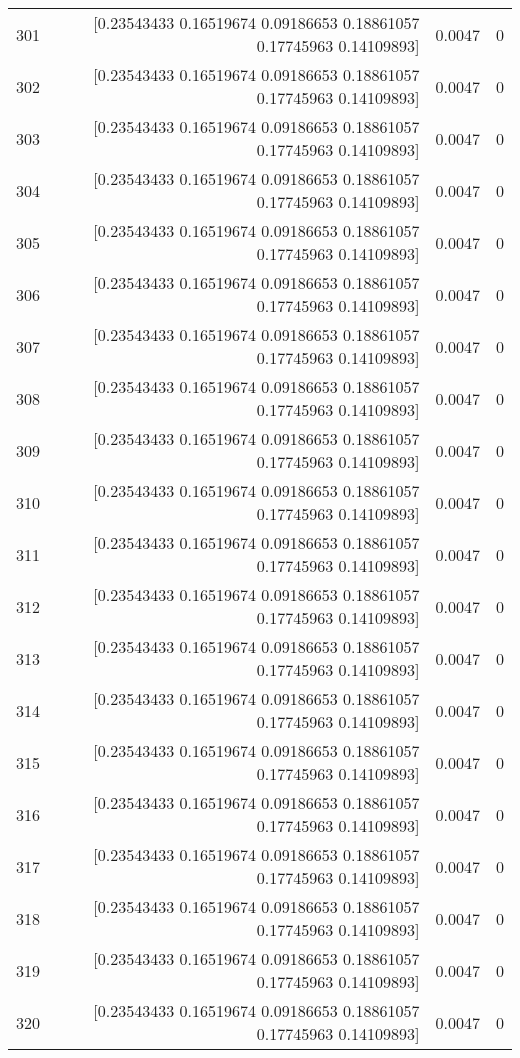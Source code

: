 \begin{longtable}{lrrr}
301 & [0.23543433 0.16519674 0.09186653 0.18861057 0.17745963 0.14109893] & 0.0047 & 0 \\
302 & [0.23543433 0.16519674 0.09186653 0.18861057 0.17745963 0.14109893] & 0.0047 & 0 \\
303 & [0.23543433 0.16519674 0.09186653 0.18861057 0.17745963 0.14109893] & 0.0047 & 0 \\
304 & [0.23543433 0.16519674 0.09186653 0.18861057 0.17745963 0.14109893] & 0.0047 & 0 \\
305 & [0.23543433 0.16519674 0.09186653 0.18861057 0.17745963 0.14109893] & 0.0047 & 0 \\
306 & [0.23543433 0.16519674 0.09186653 0.18861057 0.17745963 0.14109893] & 0.0047 & 0 \\
307 & [0.23543433 0.16519674 0.09186653 0.18861057 0.17745963 0.14109893] & 0.0047 & 0 \\
308 & [0.23543433 0.16519674 0.09186653 0.18861057 0.17745963 0.14109893] & 0.0047 & 0 \\
309 & [0.23543433 0.16519674 0.09186653 0.18861057 0.17745963 0.14109893] & 0.0047 & 0 \\
310 & [0.23543433 0.16519674 0.09186653 0.18861057 0.17745963 0.14109893] & 0.0047 & 0 \\
311 & [0.23543433 0.16519674 0.09186653 0.18861057 0.17745963 0.14109893] & 0.0047 & 0 \\
312 & [0.23543433 0.16519674 0.09186653 0.18861057 0.17745963 0.14109893] & 0.0047 & 0 \\
313 & [0.23543433 0.16519674 0.09186653 0.18861057 0.17745963 0.14109893] & 0.0047 & 0 \\
314 & [0.23543433 0.16519674 0.09186653 0.18861057 0.17745963 0.14109893] & 0.0047 & 0 \\
315 & [0.23543433 0.16519674 0.09186653 0.18861057 0.17745963 0.14109893] & 0.0047 & 0 \\
316 & [0.23543433 0.16519674 0.09186653 0.18861057 0.17745963 0.14109893] & 0.0047 & 0 \\
317 & [0.23543433 0.16519674 0.09186653 0.18861057 0.17745963 0.14109893] & 0.0047 & 0 \\
318 & [0.23543433 0.16519674 0.09186653 0.18861057 0.17745963 0.14109893] & 0.0047 & 0 \\
319 & [0.23543433 0.16519674 0.09186653 0.18861057 0.17745963 0.14109893] & 0.0047 & 0 \\
320 & [0.23543433 0.16519674 0.09186653 0.18861057 0.17745963 0.14109893] & 0.0047 & 0 \\

\end{longtable}
